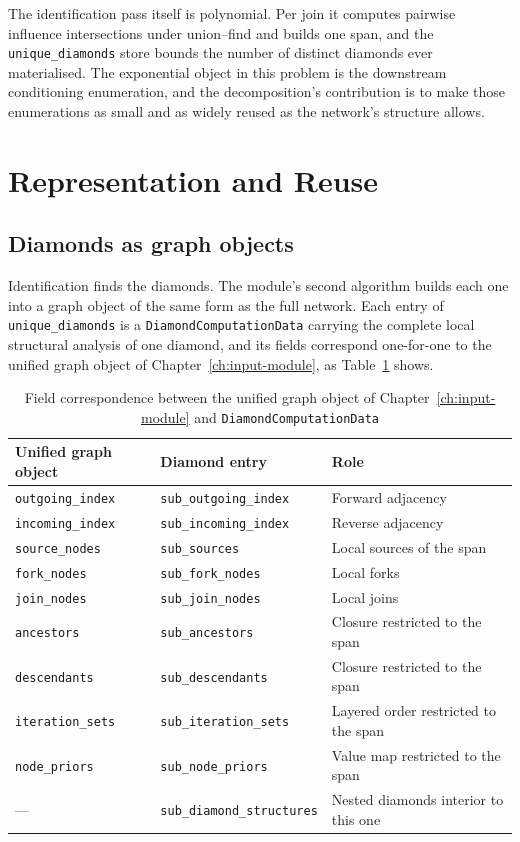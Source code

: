 \documentclass[12pt]{report}
\begin{document}
The identification pass itself is polynomial. Per join it computes pairwise influence intersections under union--find and builds one span, and the \texttt{unique\_diamonds} store bounds the number of distinct diamonds ever materialised. The exponential object in this problem is the downstream conditioning enumeration, and the decomposition's contribution is to make those enumerations as small and as widely reused as the network's structure allows.

\section{Representation and Reuse}
\label{sec:dd-representation}

\subsection{Diamonds as graph objects}
\label{sec:dd-selfsimilar}

Identification finds the diamonds. The module's second algorithm builds each one into a graph object of the same form as the full network. Each entry of \texttt{unique\_diamonds} is a \texttt{DiamondComputationData} carrying the complete local structural analysis of one diamond, and its fields correspond one-for-one to the unified graph object of Chapter~\ref{ch:input-module}, as Table~\ref{tab:dd-selfsimilar} shows.

\begin{table}[htbp]
\centering
\caption{Field correspondence between the unified graph object of Chapter~\ref{ch:input-module} and \texttt{DiamondComputationData}}
\label{tab:dd-selfsimilar}
\small
\renewcommand{\arraystretch}{1.15}
\begin{tabular}{|l|l|p{}|}
\hline
\textbf{Unified graph object} & \textbf{Diamond entry} & \textbf{Role} \\
\hline
\texttt{outgoing\_index} & \texttt{sub\_outgoing\_index} & Forward adjacency \\
\texttt{incoming\_index} & \texttt{sub\_incoming\_index} & Reverse adjacency \\
\texttt{source\_nodes} & \texttt{sub\_sources} & Local sources of the span \\
\texttt{fork\_nodes} & \texttt{sub\_fork\_nodes} & Local forks \\
\texttt{join\_nodes} & \texttt{sub\_join\_nodes} & Local joins \\
\texttt{ancestors} & \texttt{sub\_ancestors} & Closure restricted to the span \\
\texttt{descendants} & \texttt{sub\_descendants} & Closure restricted to the span \\
\texttt{iteration\_sets} & \texttt{sub\_iteration\_sets} & Layered order restricted to the span \\
\texttt{node\_priors} & \texttt{sub\_node\_priors} & Value map restricted to the span \\
--- & \texttt{sub\_diamond\_structures} & Nested diamonds interior to this one \\
\hline
\end{tabular}
\end{table}
\end{document}
